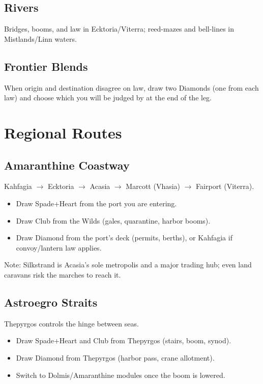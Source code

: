 \subsection{Rivers}
Bridges, booms, and law in Ecktoria/Viterra; reed-mazes and bell-lines in Mistlands/Linn waters.

\subsection{Frontier Blends}
When origin and destination disagree on law, draw two Diamonds (one from each law) and choose which you will be judged by at the end of the leg.

\section{Regional Routes}

\subsection{Amaranthine Coastway}
Kahfagia $\rightarrow$ Ecktoria $\rightarrow$ Acasia $\rightarrow$ Marcott (Vhasia) $\rightarrow$ Fairport (Viterra).

\begin{itemize}
\item Draw Spade+Heart from the port you are entering.
\item Draw Club from the Wilds (gales, quarantine, harbor booms).
\item Draw Diamond from the port's deck (permits, berths), or Kahfagia if convoy/lantern law applies.
\end{itemize}

Note: Silkstrand is Acasia's sole metropolis and a major trading hub; even land caravans risk the marches to reach it.

\subsection{Astroegro Straits}
Thepyrgos controls the hinge between seas.

\begin{itemize}
\item Draw Spade+Heart and Club from Thepyrgos (stairs, boom, synod).
\item Draw Diamond from Thepyrgos (harbor pass, crane allotment).
\item Switch to Dolmis/Amaranthine modules once the boom is lowered.
\end{itemize}

